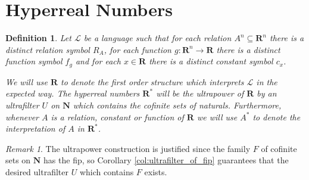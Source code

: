 \documentclass[leqno]{article}
\newtheorem{definition}{Definition}[section]
\theoremstyle{remark}
\newtheorem{remark}{Remark}[section]
\newcommand{\N}{\mathbf{N}}
\newcommand{\R}{\mathbf{R}}
\newcommand{\lang}{\mathcal{L}}
\newcommand{\hyper}[1]{#1^*}
\begin{document}
\section{Hyperreal Numbers}
    \begin{definition}
        Let $\lang$ be a language such that for each relation $A^n \subseteq \R^n$ there is a distinct relation symbol $R_{A}$, for each function $g : \R^n \to \R$ there is a distinct function symbol $f_{g}$ and for each $x \in \R$ there is a distinct constant symbol $c_{x}$.
        
        We will use $\R$ to denote the first order structure which interprets $\lang$ in the expected way. The hyperreal numbers $\hyper{\R}$ will be the ultrapower of $\R$ by an ultrafilter $U$ on $\N$ which contains the cofinite sets of naturals. Furthermore, whenever $A$ is a relation, constant or function of $\R$ we will use $\hyper{A}$ to denote the interpretation of $A$ in $\hyper{\R}$.
    \end{definition}
    \begin{remark}
        The ultrapower construction is justified since the family $F$ of cofinite sets on $\N$ has the fip, so Corollary \ref{col:ultrafilter_of_fip} guarantees that the desired ultrafilter $U$ which contains $F$ exists.
    \end{remark}
\end{document}
